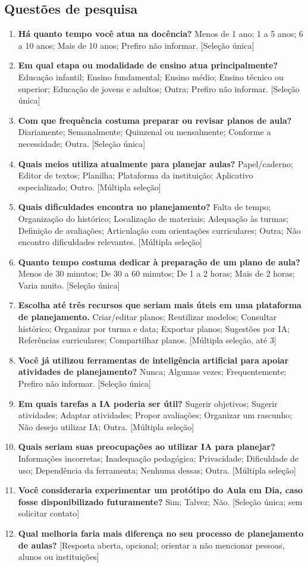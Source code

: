 \documentclass[12pt,a4paper,oneside]{report}
\begin{document}
\subsection{Questões de pesquisa}
\begin{enumerate}[label=\textbf{Q\arabic*.},leftmargin=1.3cm]
 \item \textbf{Há quanto tempo você atua na docência?} Menos de 1 ano; 1 a 5 anos; 6 a 10 anos; Mais de 10 anos; Prefiro não informar. [Seleção única]
 \item \textbf{Em qual etapa ou modalidade de ensino atua principalmente?} Educação infantil; Ensino fundamental; Ensino médio; Ensino técnico ou superior; Educação de jovens e adultos; Outra; Prefiro não informar. [Seleção única]
 \item \textbf{Com que frequência costuma preparar ou revisar planos de aula?} Diariamente; Semanalmente; Quinzenal ou mensalmente; Conforme a necessidade; Outra. [Seleção única]
 \item \textbf{Quais meios utiliza atualmente para planejar aulas?} Papel/caderno; Editor de textos; Planilha; Plataforma da instituição; Aplicativo especializado; Outro. [Múltipla seleção]
 \item \textbf{Quais dificuldades encontra no planejamento?} Falta de tempo; Organização do histórico; Localização de materiais; Adequação às turmas; Definição de avaliações; Articulação com orientações curriculares; Outra; Não encontro dificuldades relevantes. [Múltipla seleção]
 \item \textbf{Quanto tempo costuma dedicar à preparação de um plano de aula?} Menos de 30 minutos; De 30 a 60 minutos; De 1 a 2 horas; Mais de 2 horas; Varia muito. [Seleção única]
 \item \textbf{Escolha até três recursos que seriam mais úteis em uma plataforma de planejamento.} Criar/editar planos; Reutilizar modelos; Consultar histórico; Organizar por turma e data; Exportar planos; Sugestões por IA; Referências curriculares; Compartilhar planos. [Múltipla seleção, até 3]
 \item \textbf{Você já utilizou ferramentas de inteligência artificial para apoiar atividades de planejamento?} Nunca; Algumas vezes; Frequentemente; Prefiro não informar. [Seleção única]
 \item \textbf{Em quais tarefas a IA poderia ser útil?} Sugerir objetivos; Sugerir atividades; Adaptar atividades; Propor avaliações; Organizar um rascunho; Não desejo utilizar IA; Outra. [Múltipla seleção]
 \item \textbf{Quais seriam suas preocupações ao utilizar IA para planejar?} Informações incorretas; Inadequação pedagógica; Privacidade; Dificuldade de uso; Dependência da ferramenta; Nenhuma dessas; Outra. [Múltipla seleção]
 \item \textbf{Você consideraria experimentar um protótipo do Aula em Dia, caso fosse disponibilizado futuramente?} Sim; Talvez; Não. [Seleção única; sem solicitar contato]
 \item \textbf{Qual melhoria faria mais diferença no seu processo de planejamento de aulas?} [Resposta aberta, opcional; orientar a não mencionar pessoas, alunos ou instituições]
\end{enumerate}
\end{document}
